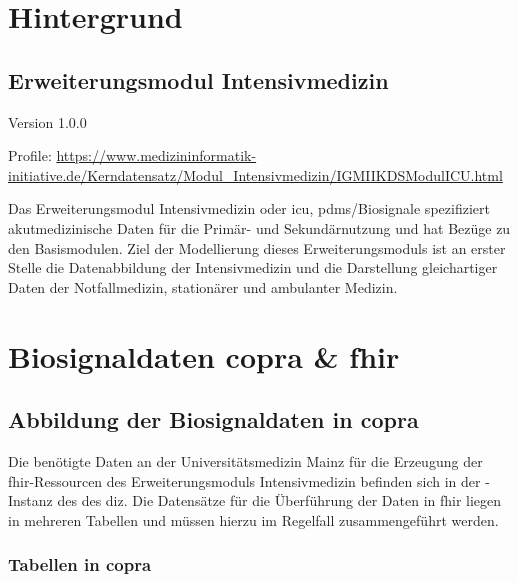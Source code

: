 \chapter{Hintergrund} \label{ch:backg}

\section{Erweiterungsmodul Intensivmedizin} \label{sec:icu}

Version 1.0.0

\noindent Profile: \url{https://www.medizininformatik-initiative.de/Kerndatensatz/Modul_Intensivmedizin/IGMIIKDSModulICU.html}


Das Erweiterungsmodul Intensivmedizin oder \ac{icu}, \acs{pdms}/Biosignale spezifiziert akutmedizinische Daten für die Primär- und Sekundärnutzung und hat Bezüge zu den Basismodulen. Ziel der Modellierung dieses Erweiterungsmoduls ist an erster Stelle die Datenabbildung der Intensivmedizin und die Darstellung gleichartiger Daten der Notfallmedizin, stationärer und ambulanter Medizin.

\chapter{Biosignaldaten \acs{copra} \& \acs{fhir}} \label{ch:coprafhir}

\section{Abbildung der Biosignaldaten in \acs{copra}} \label{sec:copra}

Die benötigte Daten an der Universitätsmedizin Mainz für die Erzeugung der \ac{fhir}-Ressourcen des Erweiterungsmoduls Intensivmedizin befinden sich in der -Instanz des  des \ac{diz}. Die Datensätze für die Überführung der Daten in \ac{fhir} liegen in mehreren Tabellen und müssen hierzu im Regelfall zusammengeführt werden.

\subsection{Tabellen in \acs{copra}} \label{subsec:copratab}

